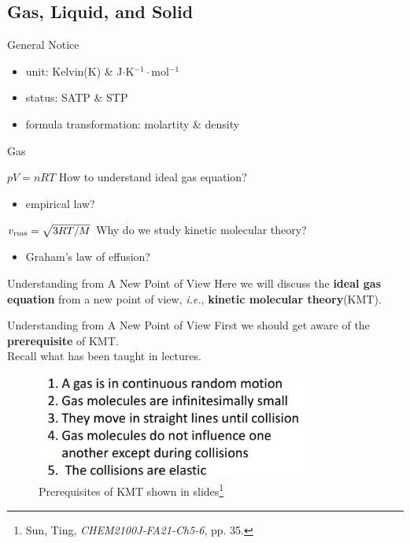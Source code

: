 \documentclass[12pt,compress]{beamer}
\begin{document}
\subsection{Gas, Liquid, and Solid}
\begin{frame}{General Notice}
	\begin{itemize}
		\item unit: Kelvin(K) \& J$\cdot$K$^{-1}\cdot$mol$^{-1}$
		\item status: SATP \& STP
		\item formula transformation: molartity \& density
	\end{itemize}
\end{frame}
\begin{frame}{Gas}
	\begin{block}{$pV=nRT$}
		How to understand ideal gas equation?
		\begin{itemize}
			\item empirical law?
		\end{itemize}
	\end{block}
	\begin{block}{$v_{\rm rms}=\sqrt{3RT/M}$}
		Why do we study kinetic molecular theory?
		\begin{itemize}
			\item Graham’s law of effusion?
		\end{itemize}
	\end{block}
\end{frame}
\begin{frame}{Understanding from A New Point of View}
	Here we will discuss the \textbf{ideal gas equation} from a new point of view,
	\textit{i.e.}, \textbf{kinetic molecular theory}(KMT).
\end{frame}
\begin{frame}{Understanding from A New Point of View}
	First we should get aware of the \textbf{prerequisite} of KMT. \\
	\pause
	Recall what has been taught in lectures.
	\begin{figure}[!htbp]
		\centering
		\includegraphics[width=0.8\textwidth]{KMT_slide.png}
		\caption*{\footnotesize{Prerequisites of KMT shown in slides\footnote{\tiny{Sun, Ting, \textit{CHEM2100J-FA21-Ch5-6}, pp. 35.}}}}
	\end{figure}
\end{frame}
\end{document}
